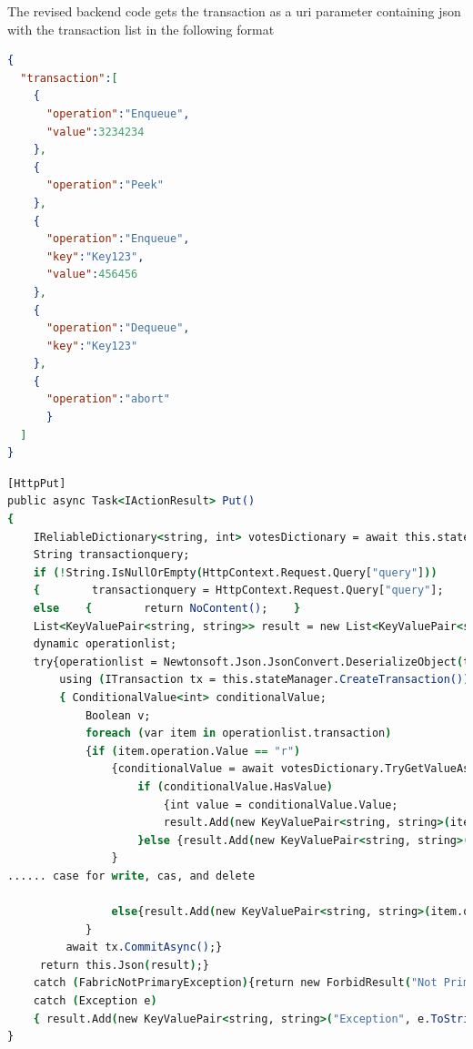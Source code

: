 \documentclass[a4paper,10pt,titlepage]{report}
\begin{document}
    
    The revised backend code gets the transaction as a uri parameter containing json with the transaction list in the following format\\
    \begin{lstlisting}[language=json]
    {
  "transaction":[
    {
      "operation":"Enqueue",
      "value":3234234
    },
    {
      "operation":"Peek"
    },
    {
      "operation":"Enqueue",
      "key":"Key123",
      "value":456456
    },
    {
      "operation":"Dequeue",
      "key":"Key123"
    },
    {
      "operation":"abort"
      }
  ]
}
    \end{lstlisting}  
    \begin{lstlisting}[language=csh]
[HttpPut]
public async Task<IActionResult> Put()
{
    IReliableDictionary<string, int> votesDictionary = await this.stateManager.GetOrAddAsync<IReliableDictionary<string, int>>("counts");
    String transactionquery;
    if (!String.IsNullOrEmpty(HttpContext.Request.Query["query"]))
    {        transactionquery = HttpContext.Request.Query["query"];    }
    else    {        return NoContent();    }
    List<KeyValuePair<string, string>> result = new List<KeyValuePair<string, string>>();
    dynamic operationlist;
    try{operationlist = Newtonsoft.Json.JsonConvert.DeserializeObject(transactionquery);
        using (ITransaction tx = this.stateManager.CreateTransaction())
        { ConditionalValue<int> conditionalValue;
            Boolean v;
            foreach (var item in operationlist.transaction)
            {if (item.operation.Value == "r")
                {conditionalValue = await votesDictionary.TryGetValueAsync(tx, item.key.Value);
                    if (conditionalValue.HasValue)
                        {int value = conditionalValue.Value;
                        result.Add(new KeyValuePair<string, string>(item.key.Value, value.ToString()));
                    }else {result.Add(new KeyValuePair<string, string>(item.key.Value, "False")); }
                }
...... case for write, cas, and delete

                else{result.Add(new KeyValuePair<string, string>(item.operation.Value, "Failed"));}
            }
         await tx.CommitAsync();}
     return this.Json(result);}
    catch (FabricNotPrimaryException){return new ForbidResult("Not Primary");}
    catch (Exception e)
    { result.Add(new KeyValuePair<string, string>("Exception", e.ToString()));return this.Json(result);}
}
\end{lstlisting}  
\end{document}
